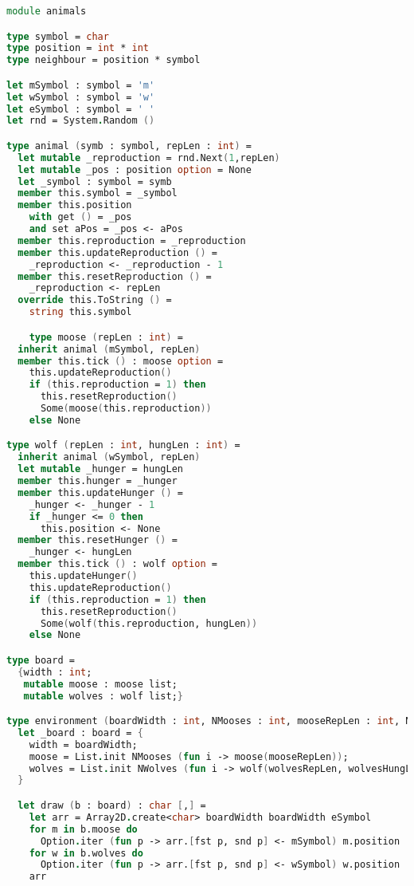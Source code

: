 \begin{lstlisting}[language=FSharp]
    module animals

type symbol = char
type position = int * int
type neighbour = position * symbol

let mSymbol : symbol = 'm'
let wSymbol : symbol = 'w'
let eSymbol : symbol = ' '
let rnd = System.Random ()

type animal (symb : symbol, repLen : int) =
  let mutable _reproduction = rnd.Next(1,repLen)
  let mutable _pos : position option = None
  let _symbol : symbol = symb
  member this.symbol = _symbol
  member this.position
    with get () = _pos
    and set aPos = _pos <- aPos
  member this.reproduction = _reproduction
  member this.updateReproduction () =
    _reproduction <- _reproduction - 1
  member this.resetReproduction () =
    _reproduction <- repLen
  override this.ToString () =
    string this.symbol

    type moose (repLen : int) =
  inherit animal (mSymbol, repLen)
  member this.tick () : moose option =
    this.updateReproduction()
    if (this.reproduction = 1) then
      this.resetReproduction()
      Some(moose(this.reproduction))
    else None

type wolf (repLen : int, hungLen : int) =
  inherit animal (wSymbol, repLen)
  let mutable _hunger = hungLen
  member this.hunger = _hunger
  member this.updateHunger () =
    _hunger <- _hunger - 1
    if _hunger <= 0 then
      this.position <- None
  member this.resetHunger () =
    _hunger <- hungLen
  member this.tick () : wolf option =
    this.updateHunger()
    this.updateReproduction()
    if (this.reproduction = 1) then
      this.resetReproduction()
      Some(wolf(this.reproduction, hungLen))
    else None

type board =
  {width : int;
   mutable moose : moose list;
   mutable wolves : wolf list;}

type environment (boardWidth : int, NMooses : int, mooseRepLen : int, NWolves : int, wolvesRepLen : int, wolvesHungLen : int, verbose : bool) =
  let _board : board = {
    width = boardWidth;
    moose = List.init NMooses (fun i -> moose(mooseRepLen));
    wolves = List.init NWolves (fun i -> wolf(wolvesRepLen, wolvesHungLen));
  }

  let draw (b : board) : char [,] =
    let arr = Array2D.create<char> boardWidth boardWidth eSymbol
    for m in b.moose do
      Option.iter (fun p -> arr.[fst p, snd p] <- mSymbol) m.position
    for w in b.wolves do
      Option.iter (fun p -> arr.[fst p, snd p] <- wSymbol) w.position
    arr


\end{lstlisting}
